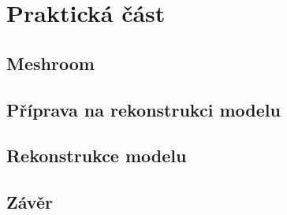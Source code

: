 \documentclass[12pt]{report}			%
\begin{document}
	\part{Praktická část}
        \chapter{Meshroom}
        \chapter{Příprava na rekonstrukci modelu}
        \chapter{Rekonstrukce modelu}


	\appendix
	
	\chapter*{Závěr}
	
		\lipsum[1]
	
	\nocite{*}
    \printbibliography					%
    \printglossary[title={Zkratky}]		%
    \listoffigures						%
    \listoftables						%
    
    \begin{prilohy}
    \end{prilohy}
\end{document}
